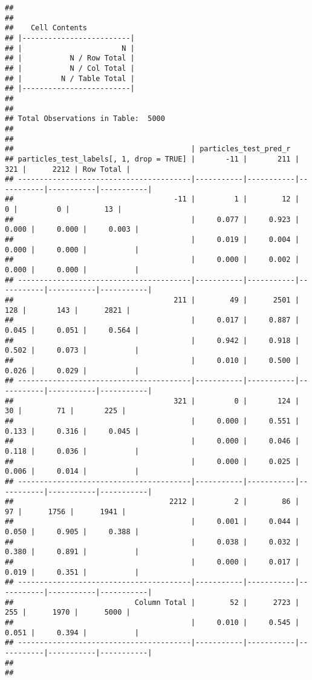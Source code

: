 \documentclass[
]{article}
\begin{document}
\begin{verbatim}
## 
##  
##    Cell Contents
## |-------------------------|
## |                       N |
## |           N / Row Total |
## |           N / Col Total |
## |         N / Table Total |
## |-------------------------|
## 
##  
## Total Observations in Table:  5000 
## 
##  
##                                         | particles_test_pred_r 
## particles_test_labels[, 1, drop = TRUE] |       -11 |       211 |       321 |      2212 | Row Total | 
## ----------------------------------------|-----------|-----------|-----------|-----------|-----------|
##                                     -11 |         1 |        12 |         0 |         0 |        13 | 
##                                         |     0.077 |     0.923 |     0.000 |     0.000 |     0.003 | 
##                                         |     0.019 |     0.004 |     0.000 |     0.000 |           | 
##                                         |     0.000 |     0.002 |     0.000 |     0.000 |           | 
## ----------------------------------------|-----------|-----------|-----------|-----------|-----------|
##                                     211 |        49 |      2501 |       128 |       143 |      2821 | 
##                                         |     0.017 |     0.887 |     0.045 |     0.051 |     0.564 | 
##                                         |     0.942 |     0.918 |     0.502 |     0.073 |           | 
##                                         |     0.010 |     0.500 |     0.026 |     0.029 |           | 
## ----------------------------------------|-----------|-----------|-----------|-----------|-----------|
##                                     321 |         0 |       124 |        30 |        71 |       225 | 
##                                         |     0.000 |     0.551 |     0.133 |     0.316 |     0.045 | 
##                                         |     0.000 |     0.046 |     0.118 |     0.036 |           | 
##                                         |     0.000 |     0.025 |     0.006 |     0.014 |           | 
## ----------------------------------------|-----------|-----------|-----------|-----------|-----------|
##                                    2212 |         2 |        86 |        97 |      1756 |      1941 | 
##                                         |     0.001 |     0.044 |     0.050 |     0.905 |     0.388 | 
##                                         |     0.038 |     0.032 |     0.380 |     0.891 |           | 
##                                         |     0.000 |     0.017 |     0.019 |     0.351 |           | 
## ----------------------------------------|-----------|-----------|-----------|-----------|-----------|
##                            Column Total |        52 |      2723 |       255 |      1970 |      5000 | 
##                                         |     0.010 |     0.545 |     0.051 |     0.394 |           | 
## ----------------------------------------|-----------|-----------|-----------|-----------|-----------|
## 
## 
\end{verbatim}
\end{document}
